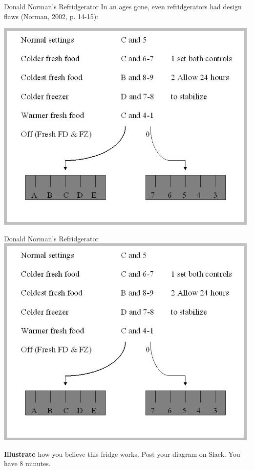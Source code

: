 \begin{frame}{Donald Norman's Refridgerator}
	In an ages gone, even refridgerators had design flaws (Norman, 2002, p. 14-15):
	
	\vspace{2ex}
			
	\includegraphics[height=24ex]{norman_fridge_controls.jpg}
\end{frame}

\begin{frame}{Donald Norman's Refridgerator}		
	\includegraphics[height=24ex]{norman_fridge_controls.jpg}
	
	\vspace{2ex}
	
	\textbf{Illustrate} how you believe this fridge works. Post your diagram on Slack. You have 8 minutes.
\end{frame}

